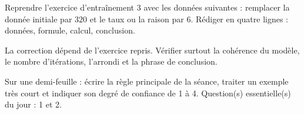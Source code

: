 
    \begin{homework}Reprendre l'exercice d'entraînement 3 avec les données suivantes : remplacer la donnée initiale par $320$ et le taux ou la raison par $6$. Rédiger en quatre lignes : données, formule, calcul, conclusion.\end{homework}
    \begin{solution}La correction dépend de l'exercice repris. Vérifier surtout la cohérence du modèle, le nombre d'itérations, l'arrondi et la phrase de conclusion.\end{solution}

    \begin{exitticket}[3 minutes]Sur une demi-feuille : écrire la règle principale de la séance, traiter un exemple très court et indiquer son degré de confiance de 1 à 4. Question(s) essentielle(s) du jour : 1 et 2.\end{exitticket}


